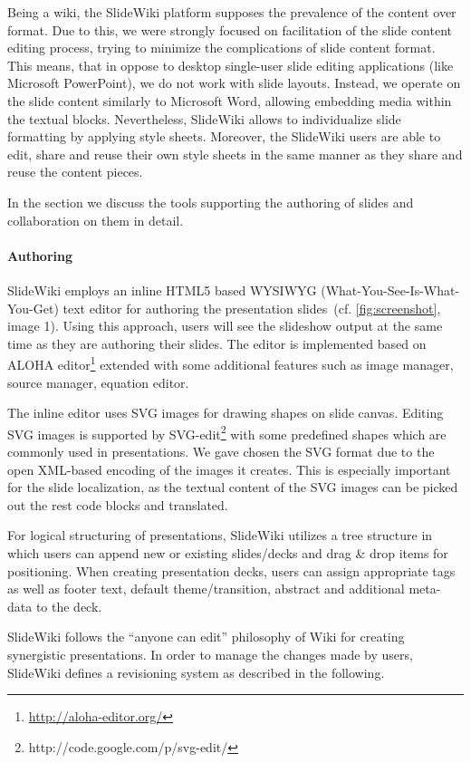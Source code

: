 \documentclass[ngerman,UKenglish,table]{scrbook}
\begin{document}
Being a wiki, the SlideWiki platform supposes the prevalence of the content over format.
Due to this, we were strongly focused on facilitation of the slide content editing process, trying to minimize the complications of slide content format.
This means, that in oppose to desktop single-user slide editing applications (like Microsoft PowerPoint), we do not work with slide layouts.
Instead, we operate on the slide content similarly to Microsoft Word, allowing embedding media within the textual blocks.
Nevertheless, SlideWiki allows to individualize slide formatting by applying style sheets.
Moreover, the SlideWiki users are able to edit, share and reuse their own style sheets in the same manner as they share and reuse the content pieces.

In the section we discuss the tools supporting the authoring of slides and collaboration on them in detail.

\paragraph{Authoring}
SlideWiki employs an inline HTML5 based WYSIWYG (What-You-See-Is-What-You-Get) text editor for authoring the presentation slides~(cf. \autoref{fig:screenshot}, image 1).
Using this approach, users will see the slideshow output at the same time as they are authoring their slides.
The editor is implemented based on ALOHA editor\footnote{\url{http://aloha-editor.org/}} extended with some additional features such as image manager, source manager, equation editor.

The inline editor uses SVG images for drawing shapes on slide canvas.
Editing SVG images is supported by SVG-edit\footnote{http://code.google.com/p/svg-edit/} with some predefined shapes which are commonly used in presentations.
We gave chosen the SVG format due to the open XML-based encoding of the images it creates.
This is especially important for the slide localization, as the textual content of the SVG images can be picked out the rest code blocks and translated.

For logical structuring of presentations, SlideWiki utilizes a tree structure in which users can append new or existing slides/decks and drag \& drop items for positioning.
When creating presentation decks, users can assign appropriate tags as well as footer text, default theme/transition, abstract and additional meta-data to the deck.

SlideWiki follows the ``anyone can edit'' philosophy of Wiki for creating synergistic presentations.
In order to manage the changes made by users, SlideWiki defines a revisioning system as described in the following.
\end{document}
